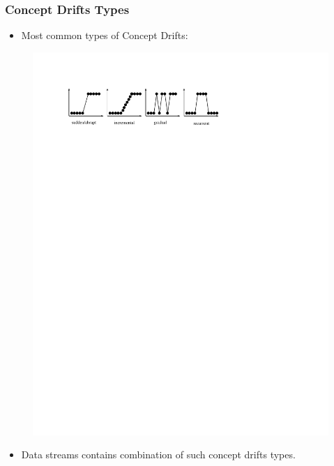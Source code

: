 \documentclass[14pt]{beamer}
\begin{document}
\begin{frame}\frametitle{Concept Drifts Types}
\begin{itemize}
\item Most common types of Concept Drifts:
\end{itemize}

\vspace{0.1in}
\begin{figure}
\centering
\includegraphics[scale=1]{concept_drift}
\end{figure}
\pause
\begin{itemize}
\item Data streams contains combination of such concept drifts types.
\end{itemize}
\end{frame}
\end{document}
